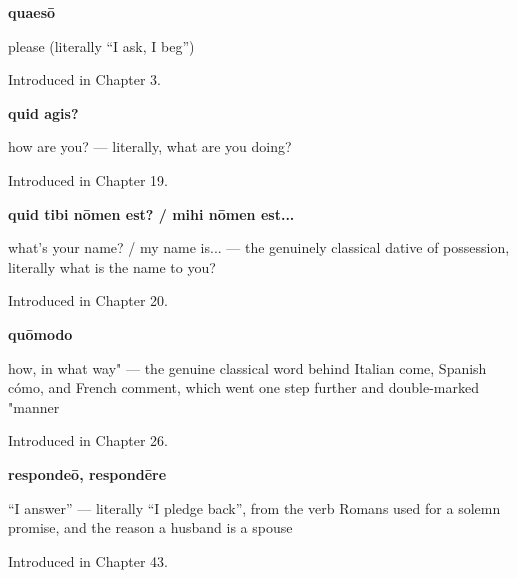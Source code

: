 \noindent\begin{minipage}[t]{\linewidth}
\raggedright
\textbf{quaesō}\par
\small please (literally \textquotedblleft{}I ask, I beg\textquotedblright{})\par
\footnotesize Introduced in Chapter 3.
\end{minipage}\par\medskip

\noindent\begin{minipage}[t]{\linewidth}
\raggedright
\textbf{quid agis?}\par
\small how are you? — literally, what are you doing?\par
\footnotesize Introduced in Chapter 19.
\end{minipage}\par\medskip

\noindent\begin{minipage}[t]{\linewidth}
\raggedright
\textbf{quid tibi nōmen est? / mihi nōmen est...}\par
\small what's your name? / my name is... — the genuinely classical dative of possession, literally what is the name to you?\par
\footnotesize Introduced in Chapter 20.
\end{minipage}\par\medskip

\noindent\begin{minipage}[t]{\linewidth}
\raggedright
\textbf{quōmodo}\par
\small how, in what way" — the genuine classical word behind Italian come, Spanish cómo, and French comment, which went one step further and double-marked "manner\par
\footnotesize Introduced in Chapter 26.
\end{minipage}\par\medskip

\noindent\begin{minipage}[t]{\linewidth}
\raggedright
\textbf{respondeō, respondēre}\par
\small \textquotedblleft{}I answer\textquotedblright{} — literally \textquotedblleft{}I pledge back\textquotedblright{}, from the verb Romans used for a solemn promise, and the reason a husband is a spouse\par
\footnotesize Introduced in Chapter 43.
\end{minipage}\par\medskip

